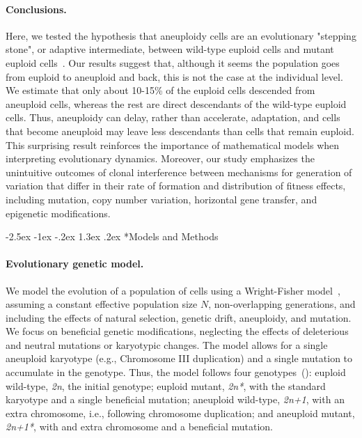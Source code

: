 \documentclass[12pt]{extarticle}
\makeatletter
\renewcommand\section{\@startsection {section}{1}{\z@}%
     {-2.5ex \@plus -1ex \@minus -.2ex}%
     {1.3ex \@plus.2ex}%
    {\Large\bfseries}}
\newcommand{\euwt}{\emph{2n}}
\newcommand{\anwt}{\emph{2n+1}}
\newcommand{\eumt}{\emph{2n*}}
\newcommand{\anmt}{\emph{2n+1*}}
\makeatother
\begin{document}
\paragraph{Conclusions.}
Here, we tested the hypothesis that aneuploidy cells are an evolutionary "stepping stone", or adaptive intermediate, between wild-type euploid cells and mutant euploid cells~\citep{Yona2015}. 
Our results suggest that, although it seems the population goes from euploid to aneuploid and back, this is not the case at the individual level. We estimate that only about 10-15\% of the euploid cells descended from aneuploid cells, whereas the rest are direct descendants of the wild-type euploid cells.
Thus, aneuploidy can delay, rather than accelerate, adaptation, and cells that become aneuploid may leave less descendants than cells that remain euploid. 
This surprising result reinforces the importance of mathematical models when interpreting evolutionary dynamics.
Moreover, our study emphasizes the unintuitive outcomes of clonal interference  between mechanisms for generation of variation that differ in their rate of formation and distribution of fitness effects, including mutation, copy number variation, horizontal gene transfer, and epigenetic modifications. 


\section*{Models and Methods}

\paragraph{Evolutionary genetic model.}
We model the evolution of a population of cells using a Wright-Fisher model~\citep{Otto2007}, assuming a constant effective population size $N$, non-overlapping generations, and including the effects of natural selection, genetic drift, aneuploidy, and mutation. 
We focus on beneficial genetic modifications, neglecting the effects of deleterious and neutral mutations or karyotypic changes.
The model allows for a single aneuploid karyotype (e.g., Chromosome III duplication) and a single mutation to accumulate in the genotype.
Thus, the model follows four genotypes~(): euploid wild-type, \euwt, the initial genotype; 
euploid mutant, \eumt, with the standard karyotype and a single beneficial mutation; 
aneuploid wild-type, \anwt, with an extra chromosome, i.e., following chromosome duplication; and
aneuploid mutant, \anmt, with and extra chromosome and a beneficial mutation. 
\end{document}
